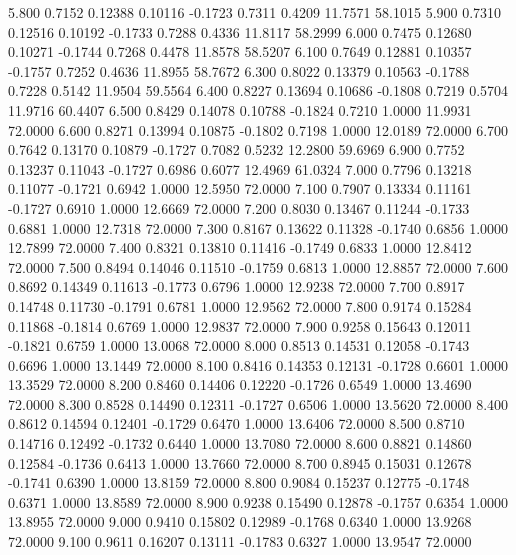    5.800   0.7152   0.12388   0.10116  -0.1723   0.7311   0.4209  11.7571  58.1015
   5.900   0.7310   0.12516   0.10192  -0.1733   0.7288   0.4336  11.8117  58.2999
   6.000   0.7475   0.12680   0.10271  -0.1744   0.7268   0.4478  11.8578  58.5207
   6.100   0.7649   0.12881   0.10357  -0.1757   0.7252   0.4636  11.8955  58.7672
   6.300   0.8022   0.13379   0.10563  -0.1788   0.7228   0.5142  11.9504  59.5564
   6.400   0.8227   0.13694   0.10686  -0.1808   0.7219   0.5704  11.9716  60.4407
   6.500   0.8429   0.14078   0.10788  -0.1824   0.7210   1.0000  11.9931  72.0000
   6.600   0.8271   0.13994   0.10875  -0.1802   0.7198   1.0000  12.0189  72.0000
   6.700   0.7642   0.13170   0.10879  -0.1727   0.7082   0.5232  12.2800  59.6969
   6.900   0.7752   0.13237   0.11043  -0.1727   0.6986   0.6077  12.4969  61.0324
   7.000   0.7796   0.13218   0.11077  -0.1721   0.6942   1.0000  12.5950  72.0000
   7.100   0.7907   0.13334   0.11161  -0.1727   0.6910   1.0000  12.6669  72.0000
   7.200   0.8030   0.13467   0.11244  -0.1733   0.6881   1.0000  12.7318  72.0000
   7.300   0.8167   0.13622   0.11328  -0.1740   0.6856   1.0000  12.7899  72.0000
   7.400   0.8321   0.13810   0.11416  -0.1749   0.6833   1.0000  12.8412  72.0000
   7.500   0.8494   0.14046   0.11510  -0.1759   0.6813   1.0000  12.8857  72.0000
   7.600   0.8692   0.14349   0.11613  -0.1773   0.6796   1.0000  12.9238  72.0000
   7.700   0.8917   0.14748   0.11730  -0.1791   0.6781   1.0000  12.9562  72.0000
   7.800   0.9174   0.15284   0.11868  -0.1814   0.6769   1.0000  12.9837  72.0000
   7.900   0.9258   0.15643   0.12011  -0.1821   0.6759   1.0000  13.0068  72.0000
   8.000   0.8513   0.14531   0.12058  -0.1743   0.6696   1.0000  13.1449  72.0000
   8.100   0.8416   0.14353   0.12131  -0.1728   0.6601   1.0000  13.3529  72.0000
   8.200   0.8460   0.14406   0.12220  -0.1726   0.6549   1.0000  13.4690  72.0000
   8.300   0.8528   0.14490   0.12311  -0.1727   0.6506   1.0000  13.5620  72.0000
   8.400   0.8612   0.14594   0.12401  -0.1729   0.6470   1.0000  13.6406  72.0000
   8.500   0.8710   0.14716   0.12492  -0.1732   0.6440   1.0000  13.7080  72.0000
   8.600   0.8821   0.14860   0.12584  -0.1736   0.6413   1.0000  13.7660  72.0000
   8.700   0.8945   0.15031   0.12678  -0.1741   0.6390   1.0000  13.8159  72.0000
   8.800   0.9084   0.15237   0.12775  -0.1748   0.6371   1.0000  13.8589  72.0000
   8.900   0.9238   0.15490   0.12878  -0.1757   0.6354   1.0000  13.8955  72.0000
   9.000   0.9410   0.15802   0.12989  -0.1768   0.6340   1.0000  13.9268  72.0000
   9.100   0.9611   0.16207   0.13111  -0.1783   0.6327   1.0000  13.9547  72.0000
